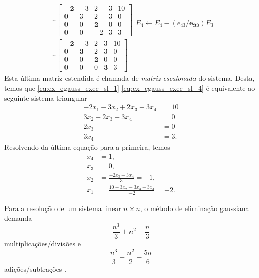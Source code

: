 \begin{ex}
\begin{align}
&\sim 
  \begin{bmatrix}
    \pmb{-2} & -3 & 2 & 3 & 10\\
    0 & 3 & 2 & 3 & 0\\
    0 & 0 & \pmb{2} & 0 & 0\\
    0 & 0 & -2 & 3 & 3
  \end{bmatrix}
  \begin{matrix}
  \\
  \\
  \\
  E_4 \leftarrow E_4 - (e_{43}/\pmb{e_{33}})E_3\\
  \end{matrix}\\
    &\sim 
      \begin{bmatrix}
        \pmb{-2} & -3 & 2 & 3 & 10\\
        0 & \pmb{3} & 2 & 3 & 0\\
        0 & 0 & \pmb{2} & 0 & 0\\
        0 & 0 & 0 & \pmb{3} & 3
      \end{bmatrix}
\end{align}
Esta última matriz estendida é chamada de \emph{matriz escalonada} do sistema. Desta, temos que \eqref{eq:ex_egauss_exec_sl_1}-\eqref{eq:ex_egauss_exec_sl_4} é equivalente ao seguinte sistema triangular
\begin{align}
  -2x_1 - 3x_2 + 2x_3 + 3x_4 &= 10\\
  3x_2 + 2x_3 + 3x_4 &= 0\\
  2x_3 &= 0\\
  3x_4 &= 3.
\end{align}
Resolvendo da última equação para a primeira, temos
\begin{align}
  x_4 &= 1,\\
  x_3 &= 0,\\
  x_2 &= \frac{-2x_3 - 3x_4}{3} = -1,\\
  x_1 &= \frac{10 + 3x_2 - 3x_3 - 3x_4}{-2} = -2.
\end{align}

% 
\end{ex}

\begin{obs}
  Para a resolução de um sistema linear $n \times n$, o método de eliminação gaussiana demanda
  \begin{equation}
    \frac{n^3}{3} + n^2 - \frac{n}{3}
  \end{equation}
multiplicações/divisões e
\begin{equation}
  \frac{n^3}{3} + \frac{n^2}{2} - \frac{5n}{6}
\end{equation}
adições/subtrações \cite{Burden2015a}.
\end{obs}

